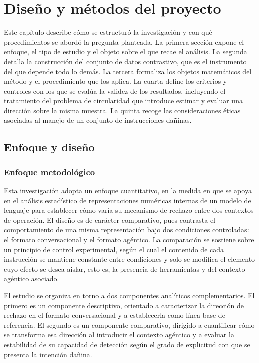\chapter{Diseño y métodos del proyecto}
\label{chap:diseno-metodos}

Este capítulo describe cómo se estructuró la investigación y con qué
procedimientos se abordó la pregunta planteada. La primera sección expone el
enfoque, el tipo de estudio y el objeto sobre el que recae el análisis. La
segunda detalla la construcción del conjunto de datos contrastivo, que es el
instrumento del que depende todo lo demás. La tercera formaliza los objetos
matemáticos del método y el procedimiento que los aplica. La cuarta define
los criterios y controles con los que se evalúa la validez de los
resultados, incluyendo el tratamiento del problema de circularidad que
introduce estimar y evaluar una dirección sobre la misma muestra. La quinta
recoge las consideraciones éticas asociadas al manejo de un conjunto de
instrucciones dañinas.

\section{Enfoque y diseño}
\label{sec:enfoque-diseno}

\subsection{Enfoque metodológico}

Esta investigación adopta un enfoque cuantitativo, en la medida en que se apoya en el análisis estadístico de representaciones numéricas internas de un modelo de lenguaje para establecer cómo varía su mecanismo de rechazo entre dos contextos de operación. El diseño es de carácter comparativo, pues contrasta el comportamiento de una misma representación bajo dos condiciones controladas: el formato conversacional y el formato agéntico. La comparación se sostiene sobre un principio de control experimental, según el cual el contenido de cada instrucción se mantiene constante entre condiciones y solo se modifica el elemento cuyo efecto se desea aislar, esto es, la presencia de herramientas y del contexto agéntico asociado.

El estudio se organiza en torno a dos componentes analíticos complementarios. El primero es un componente descriptivo, orientado a caracterizar la dirección de rechazo en el formato conversacional y a establecerla como línea base de referencia. El segundo es un componente comparativo, dirigido a cuantificar cómo se transforma esa dirección al introducir el contexto agéntico y a evaluar la estabilidad de su capacidad de detección según el grado de explicitud con que se presenta la intención dañina.


